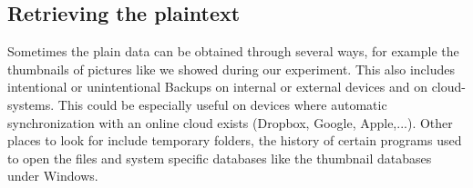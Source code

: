 \subsection{Retrieving the plaintext}
Sometimes the plain data can be obtained through several ways, for example the thumbnails of pictures like we showed during our experiment. This also includes intentional or unintentional Backups on internal or external devices and on cloud-systems.
This could be especially useful on devices where automatic synchronization with an online cloud exists (Dropbox, Google, Apple,...). Other places to look for include temporary folders, the history of certain programs used to open the files and system specific databases like the thumbnail databases under Windows.

